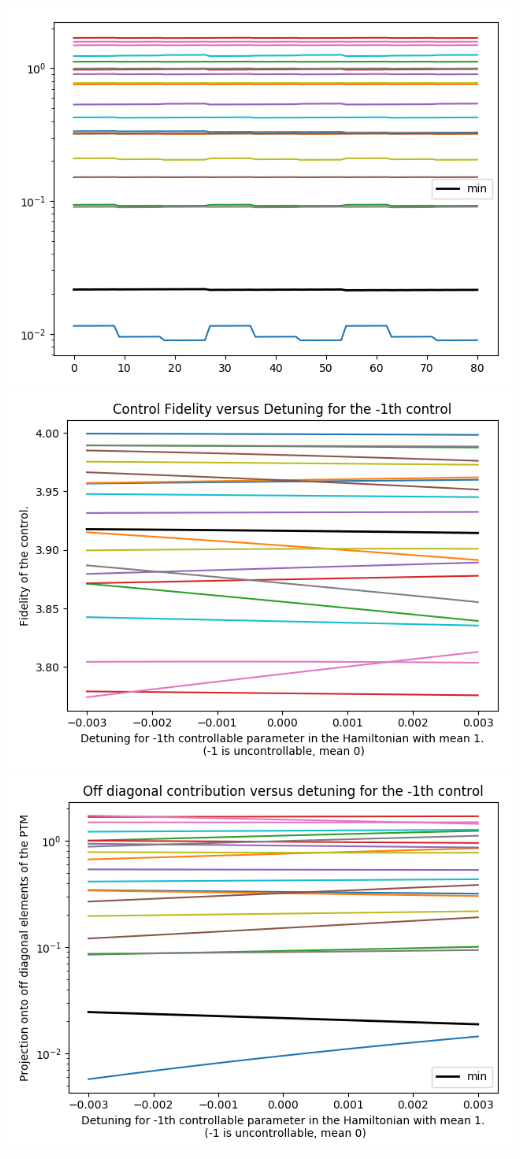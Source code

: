 \documentclass{article}
\begin{document}
\begin{center}
\includegraphics[scale=.9]{report_pickled_controls39/control_dpn_all}
\includegraphics[scale=.9]{control_fid_0}
\includegraphics[scale=.9]{off_diag_0}

\end{center}
\end{document}
